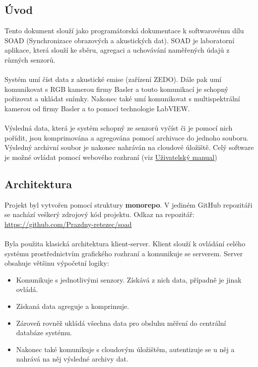 \documentclass[12pt]{article}
\begin{document}
    \begin{teamwork}
        \section{Úvod}\label{sec:uvod}

        Tento dokument slouží jako programátorská dokumentace k softwarovému dílu SOAD (Synchronizace obrazových a akustických dat).
        SOAD je laboratorní aplikace, která slouží ke sběru, agregaci a uchovávání naměřených údajů z různých senzorů.
        \\
        \\
        Systém umí číst data z akustické emise (zařízení ZEDO). Dále pak umí komunikovat s RGB kamerou firmy Basler a touto komunikací
        je schopný pořizovat a ukládat snímky.
        Nakonec také umí komunikovat s multispektrální kamerou od firmy Basler a to pomocí technologie LabVIEW\@.
        \\
        \\
        Výsledná data, která je systém schopný ze senzorů vyčíst či je pomocí nich pořídit, jsou komprimována a agregována pomocí archivace
        do jednoho souboru.
        Výsledný archivní soubor je nakonec nahráván na cloudové úložiště.
        Celý software je možné ovládat pomocí webového rozhraní (viz \href{https://github.com/Prazdny-retezec/soad/blob/11-programatorska-dokumentace/docs/cz/user/tex/out/main.pdf}{Uživatelský manual})

        \subsection{Architektura}\label{subsec:architektura}

        Projekt byl vytvořen pomocí struktury \textbf{monorepo}.
        V jediném GitHub repozitáři se nachází veškerý zdrojový kód projektu.
        Odkaz na repozitář: \href{https://github.com/Prazdny-retezec/soad}{https://github.com/Prazdny-retezec/soad}
        \\
        \\
        Byla použita klasická architektura klient-server.
        Klient slouží k ovládání celého systému prostřednictvím grafického rozhraní a komunikuje se serverem.
        Server obsahuje většinu výpočetní logiky:
        \begin{itemize}
            \item Komunikuje s jednotlivými senzory.
            Získává z nich data, případně je jinak ovládá.
            \item  Získaná data agreguje a komprimuje.
            \item Zároveň rovněž ukládá všechna data pro obsluhu měření do centrální databáze systému.
            \item Nakonec také komunikuje s cloudovým úložištěm, autentizuje se u něj a nahrává na něj výsledné archivy dat.
        \end{itemize}


\end{teamwork}
\end{document}

